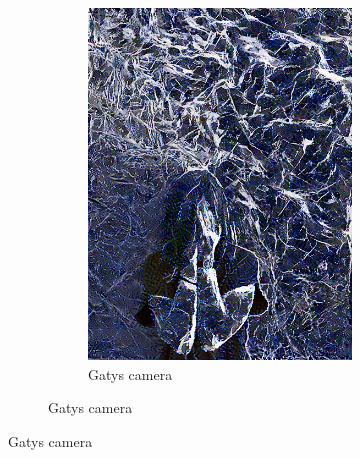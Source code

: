 \begin{figure}[]
\begin{subfigure}{\textwidth}
\begin{subfigure}{0.24\textwidth}
            \includegraphics[width=\textwidth]{images/04-experiment02/human/marble/gatys_proj.jpg}
            \caption{Gatys camera}
            \label{fig:ex02-human-marble-gatys_proj}
        \end{subfigure}
        

\end{subfigure}
\end{figure}
